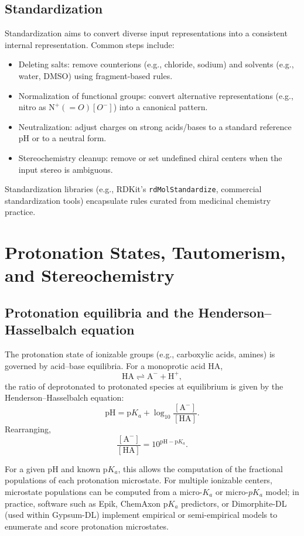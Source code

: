 \documentclass[12pt, a4paper]{article}
\begin{document}
\subsection{Standardization}

Standardization aims to convert diverse input representations into a consistent internal representation. Common steps include:
\begin{itemize}
  \item Deleting salts: remove counterions (e.g., chloride, sodium) and solvents (e.g., water, DMSO) using fragment-based rules.
  \item Normalization of functional groups: convert alternative representations (e.g., nitro as \(\mathrm{N}^{+}(=O)[O^-]\)) into a canonical pattern.
  \item Neutralization: adjust charges on strong acids/bases to a standard reference pH or to a neutral form.
  \item Stereochemistry cleanup: remove or set undefined chiral centers when the input stereo is ambiguous.
\end{itemize}

Standardization libraries (e.g., RDKit's \verb|rdMolStandardize|, commercial standardization tools) encapsulate rules curated from medicinal chemistry practice.

\section{Protonation States, Tautomerism, and Stereochemistry}

\subsection{Protonation equilibria and the Henderson--Hasselbalch equation}

The protonation state of ionizable groups (e.g., carboxylic acids, amines) is governed by acid--base equilibria. For a monoprotic acid HA,
\[
\mathrm{HA} \rightleftharpoons \mathrm{A}^- + \mathrm{H}^+,
\]
the ratio of deprotonated to protonated species at equilibrium is given by the Henderson--Hasselbalch equation:
\[
\mathrm{pH} = \mathrm{p}K_a + \log_{10} \frac{[\mathrm{A}^-]}{[\mathrm{HA}]}. 
\]
Rearranging,
\[
\frac{[\mathrm{A}^-]}{[\mathrm{HA}]} = 10^{\mathrm{pH} - \mathrm{p}K_a}.
\]

For a given pH and known p$K_a$, this allows the computation of the fractional populations of each protonation microstate. For multiple ionizable centers, microstate populations can be computed from a micro-$K_a$ or micro-$pK_a$ model; in practice, software such as Epik, ChemAxon p$K_a$ predictors, or Dimorphite-DL (used within Gypsum-DL) implement empirical or semi-empirical models to enumerate and score protonation microstates.\cite{CH6_Ropp2019,CH6_Sastry2013}
\end{document}
